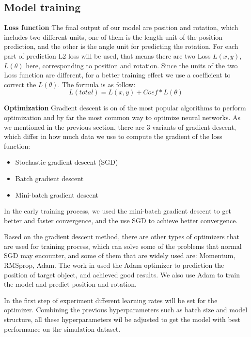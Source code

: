 \subsection{Model training}
\textbf{Loss function}
The final output of our model are position and rotation, which includes two different units, one of them is the length unit of the position prediction, and the other is the angle unit for predicting the rotation. For each part of prediction L2 loss will be used, that means there are two Loss $L(x,y)$, $L(\theta)$ here, corresponding to position and rotation. Since the units of the two Loss function are different, for a better training effect we use a coefficient to correct the $L(\theta)$. The formula is as follow:
\begin{equation}
	L(total)=L(x,y)+Coef*L(\theta)
\end{equation}

\textbf{Optimization}  
Gradient descent is on of the most popular algorithms to perform optimization and by far the most common way to optimize neural networks. As we mentioned in the previous section, there are 3 variants of gradient descent, which differ in how much data we use to compute the gradient of the loss function:
\begin{itemize}
	\item Stochastic gradient descent (SGD)
	\item Batch gradient descent
	\item Mini-batch gradient descent
\end{itemize}
In the early training process, we used the mini-batch gradient descent to get better and faster convergence, and the use SGD to achieve better convergence. 

Based on the gradient descent method, there are other types of optimizers that are used for training process, which can solve some of the problems that normal SGD may encounter, and some of them that are widely used are: Momentum, RMSprop, Adam. The work in \cite{tobin2017domain} used the Adam optimizer to prediction the position of target object, and achieved good results. We also use Adam to train the model and predict position and rotation.

In the first step of experiment different learning rates will be set for the optimizer. Combining the previous hyperparameters such as batch size and model structure, all these hyperparameters wil be adjusted to get the model with best performance on the simulation dataset.

